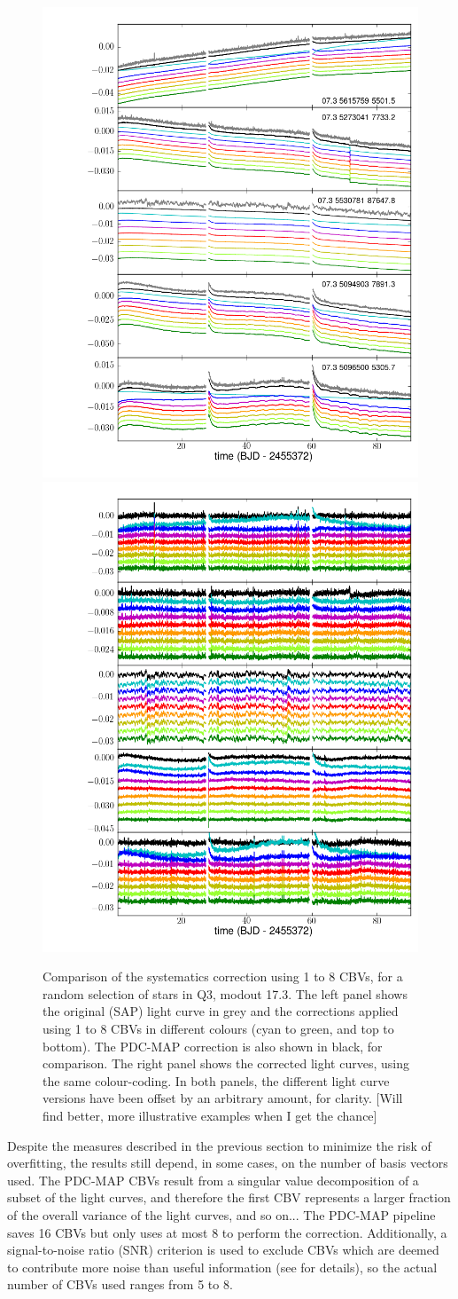 \documentclass[useAMS,usenatbib]{mn2e}
\begin{document}
\begin{figure}
  \centering
  \includegraphics[width=0.49\linewidth]{q6_mod07_out3_cbv_examples_diff.png}
  \includegraphics[width=0.49\linewidth]{q6_mod07_out3_cbv_examples.png}
  \caption{Comparison of the systematics correction using 1 to 8 CBVs,
    for a random selection of stars in Q3, modout 17.3. The left panel
    shows the original (SAP) light curve in grey and the corrections
    applied using 1 to 8 CBVs in different colours (cyan to green, and
    top to bottom). The PDC-MAP correction is also shown in black, for
    comparison. The right panel shows the corrected light curves,
    using the same colour-coding. In both panels, the different light
    curve versions have been offset by an arbitrary amount, for
    clarity. [Will find better, more illustrative examples when I get
    the chance]}
  \label{fig:ncbv_ex}
\end{figure}

Despite the measures described in the previous section to minimize the
risk of overfitting, the results still depend, in some cases, on the number of basis vectors
used. The PDC-MAP CBVs result from a singular value decomposition of a
subset of the light curves, and therefore the first CBV represents a
larger fraction of the overall variance of the light curves, and so
on... The PDC-MAP pipeline saves 16 CBVs but only uses at most 8 to
perform the correction. Additionally, a signal-to-noise ratio (SNR)
criterion is used to exclude CBVs which are deemed to contribute more
noise than useful information (see \citealt{smi+12} for details), so
the actual number of CBVs used ranges from 5 to 8. 
\end{document}

